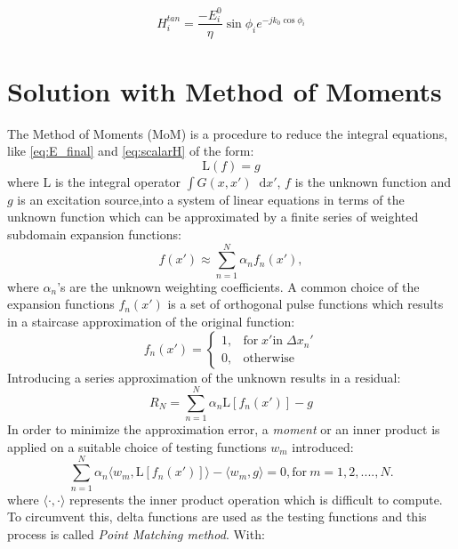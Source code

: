 \documentclass[11pt]{article}
\renewcommand{\^}{\hat}  %
\newcommand*\diff{\mathop{}\!\mathrm{d}} %
\begin{document}
\begin{equation}
  H_i^{tan} = \frac{-E_i^0}{\eta} \sin \phi_i e^{-j k_0 \cos \phi_i}
  \label{eq:H_itan}
\end{equation}
%
\section{Solution with Method of Moments}

The Method of Moments (MoM) is a procedure to reduce the integral equations, like \eqref{eq:E_final} and \eqref{eq:scalarH} of the form:
%
\begin{equation}
  \mathrm L (f) = g
  \label{eq:MoM}
\end{equation}
%
where $\mathrm L$ is the integral operator $\int G(x,x') \diff{x'}$, $f$ is the unknown function and $g$ is an excitation source,into a system of linear equations in terms of the unknown function which can be approximated by a finite series of weighted subdomain expansion functions:
\begin{equation}
    f(x') \approx \sum\limits_{n = 1}^N \alpha_n f_n(x'),
    \label{eq:MOM_f}
\end{equation}
%
where $\alpha_n$'s are the unknown weighting coefficients. A common choice of  the expansion functions $f_n(x')$ is a set of orthogonal pulse functions which results in a staircase approximation of the original function:
%
 \begin{equation}
   f_n(x') =
   \begin{cases}
     1, & \text{for}\; x' \text{in}\; \Delta x_n'  \\
     0, & \text{otherwise}
   \end{cases}
   \label{eq:pulse}
 \end{equation}
%
Introducing a series approximation of the unknown results in a residual:
\begin{equation}
  R_N = \sum \limits_{n = 1}^N \alpha_n \mathrm L [f_n(x')] - g
  \label{eq:residual}
\end{equation}
%
In order to minimize the approximation error, a \emph{moment} or an inner product is applied on a suitable choice of testing functions $w_m$ introduced:
%
\begin{equation}
  \sum \limits_{n = 1}^N \alpha_n \langle w_m, \mathrm L [f_n(x')] \rangle - \langle w_m, g \rangle = 0, \text{for}\ m = 1,2,....,N.
  \label{eq:moment}
\end{equation}
%
where $\langle \cdot, \cdot \rangle$ represents the inner product operation which is difficult to compute. To circumvent this, delta functions are used as the testing functions and this process is called \emph{ Point Matching method}. With:
\end{document}
